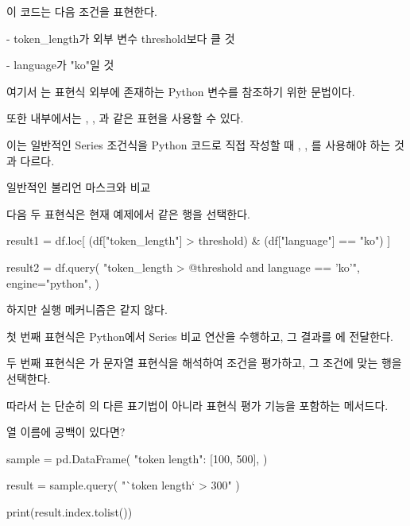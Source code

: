 이 코드는 다음 조건을 표현한다.

\begin{dhksmry}
    - token_length가 외부 변수 threshold보다 클 것

    - language가 "ko"일 것
\end{dhksmry}

여기서 는  표현식 외부에 존재하는 Python 변수를 참조하기 위한 문법이다.

또한  내부에서는 , , 과 같은 표현을 사용할 수 있다.

이는 일반적인 Series 조건식을 Python 코드로 직접 작성할 때 \zsh{&}, \zsh{|}, \zsh{~}를 사용해야 하는 것과 다르다.

\begin{dhknote}
\begin{dhksmry}[centered]
일반적인 불리언 마스크와 비교
\end{dhksmry}
\end{dhknote}

다음 두 표현식은 현재 예제에서 같은 행을 선택한다.

\begin{dhkcode}
result1 = df.loc[
    (df["token_length"] > threshold)
    & (df["language"] == "ko")
]

result2 = df.query(
    "token_length > @threshold and language == 'ko'",
    engine="python",
)
\end{dhkcode}

하지만 실행 메커니즘은 같지 않다.

첫 번째 표현식은 Python에서 Series 비교 연산을 수행하고, 그 결과를 에 전달한다.

두 번째 표현식은 가 문자열 표현식을 해석하여 조건을 평가하고, 그 조건에 맞는 행을 선택한다.

따라서 는 단순히 의 다른 표기법이 아니라 표현식 평가 기능을 포함하는 메서드다.

\begin{dhknote}
\begin{dhksmry}[centered]
열 이름에 공백이 있다면?
\end{dhksmry}
\end{dhknote}

\begin{dhkcode}
sample = pd.DataFrame({
    "token length": [100, 500],
})

result = sample.query(
    "`token length` > 300"
)

print(result.index.tolist())
\end{dhkcode}

